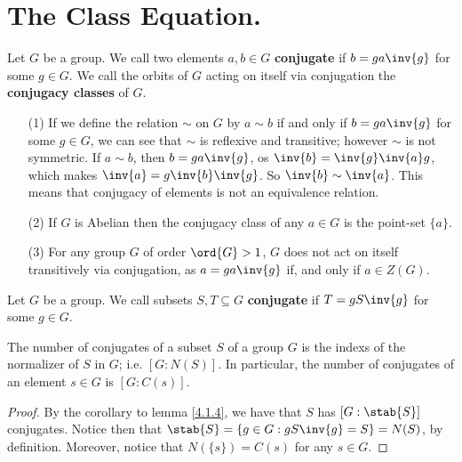 \section{The Class Equation.}

\begin{definition}
    Let $G$ be a group. We call two elements  $a,b \in G$ \textbf{conjugate} if
    $b=ga\inv{g}$ for some $g \in G$. We call the orbits of $G$ acting on itself
    via conjugation the \textbf{conjugacy classes} of $G$.
\end{definition}

\begin{example}\label{}
    \begin{enumerate}
        \item[(1)] If we define the relation $\sim$ on $G$ by $a \sim b$ if and
            only if  $b=ga\inv{g}$ for some $g \in G$, we can see that  $\sim$
            is reflexive and transitive; however  $\sim$ is not symmetric. If $a
            \sim b$, then  $b=ga\inv{g}$, os $\inv{b}=\inv{g}\inv{a}g$, which
            makes $\inv{a}=g\inv{b}\inv{g}$. So $\inv{b} \sim \inv{a}$. This
            means that conjugacy of elements is not an equivalence relation.

        \item[(2)] If $G$ is Abelian then the conjugacy class of any $a \in G$
            is the point-set $\{a\}$.

        \item[(3)] For any group $G$ of order  $\ord{G}>1$, $G$ does not act on
            itself transitively via conjugation, as  $a=ga\inv{g}$ if, and only
            if $a \in Z(G)$.
    \end{enumerate}
\end{example}

\begin{definition}
    Let $G$ be a group. We call subsets  $S,T \subseteq G$  \textbf{conjugate}
    if $T=gS\inv{g}$ for some $g \in G$.
\end{definition}

\begin{lemma}\label{4.3.1}
    The number of conjugates of a subset $S$ of a group  $G$ is the indexs of
    the normalizer of $S$ in $G$; i.e.  $[G:N(S)]$. In particular, the number of
    conjugates of an element $s \in G$ is  $[G:C(s)]$.
\end{lemma}
\begin{proof}
    By the corollary to lemma \ref{4.1.4}, we have that $S$ has  $[G:\stab{S}]$
    conjugates. Notice then that $\stab{S}=\{g \in G : gS\inv{g}=S\}=N(S)$, by
    definition. Moreover, notice that $N(\{s\})=C(s)$ for any $s \in G$.
\end{proof}

